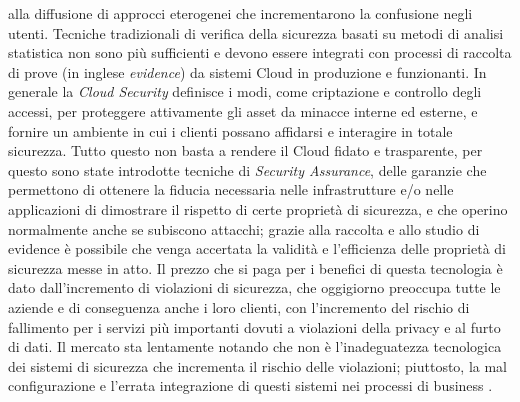 alla diffusione di approcci eterogenei che incrementarono la confusione negli utenti.
Tecniche tradizionali di verifica della sicurezza basati su metodi di analisi statistica non sono più sufficienti e devono essere integrati 
con processi di raccolta di prove (in inglese \textit{evidence}) da sistemi Cloud in produzione e funzionanti.
In generale la \textit{Cloud Security} definisce i modi, come criptazione e controllo degli accessi, per proteggere attivamente gli asset 
da minacce interne ed esterne, e fornire un ambiente in cui i clienti possano affidarsi e interagire in totale sicurezza.\hfill\break
Tutto questo non basta a rendere il Cloud fidato e trasparente, per questo sono state introdotte tecniche di
\textit{Security Assurance}, delle garanzie che permettono di ottenere la fiducia necessaria nelle infrastrutture e/o nelle 
applicazioni di dimostrare il rispetto di certe proprietà di sicurezza, e che operino normalmente anche se subiscono attacchi; grazie 
alla raccolta e allo studio di evidence è possibile che venga accertata la validità e l'efficienza delle proprietà di sicurezza messe in 
atto.\hfill\break
Il prezzo che si paga per i benefici di questa tecnologia è dato dall'incremento di violazioni di sicurezza, che oggigiorno 
preoccupa tutte le aziende e di conseguenza anche i loro clienti, con l'incremento del rischio di fallimento per i servizi più importanti 
dovuti a violazioni della privacy e al furto di dati.
Il mercato sta lentamente notando che non è l'inadeguatezza tecnologica dei sistemi di sicurezza che incrementa il rischio delle 
violazioni; piuttosto, la mal configurazione e l'errata integrazione di questi sistemi nei processi di business 
\cite{cloud-Platform-for-ICT-Security-Governance}.\hfill\break
%
